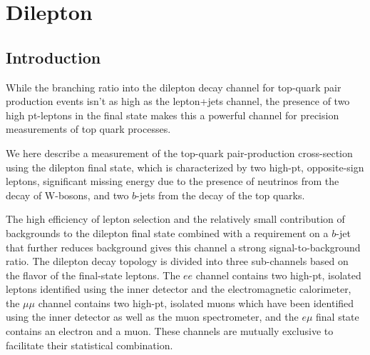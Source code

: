 
\section{Dilepton}


\subsection{Introduction}

While the branching ratio into the dilepton decay channel for top-quark pair production events
isn't as high as the lepton+jets channel, the presence of two high pt-leptons in the final state
makes this a powerful channel for precision measurements of top quark processes.

We here describe a measurement of the top-quark pair-production cross-section using the
dilepton final state, which is characterized by two high-pt, opposite-sign leptons,
significant missing energy due to the presence of neutrinos from the decay of W-bosons,
and two $b$-jets from the decay of the top quarks.



The high efficiency of lepton selection and the relatively small contribution of backgrounds
to the dilepton final state combined with a requirement on a $b$-jet that further reduces
background gives this channel a strong signal-to-background ratio.
The dilepton decay topology is divided into three sub-channels based on the flavor of the
final-state leptons.
The $ee$ channel contains two high-pt, isolated leptons identified using 
the inner detector and the electromagnetic calorimeter, the $\mu\mu$ channel contains two
high-pt, isolated muons which have been identified using the inner detector as well as the muon
spectrometer, and the $e \mu$ final state contains an electron and a muon.
These channels are mutually exclusive to facilitate their statistical combination.


